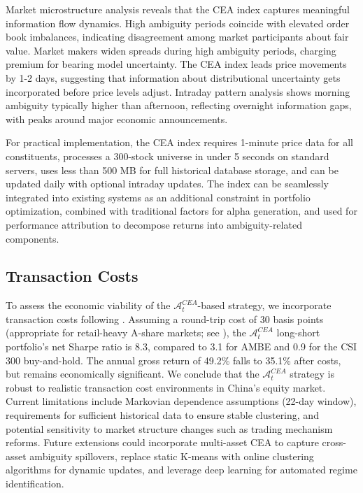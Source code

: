 \documentclass[preprint,12pt,authoryear]{elsarticle}
\renewcommand{\textcolor}[2]{\begingroup\color{#1}#2\endgroup}
\begin{document}

Market microstructure analysis reveals that the CEA index captures meaningful information flow dynamics. High ambiguity periods coincide with elevated order book imbalances, indicating disagreement among market participants about fair value. Market makers widen spreads during high ambiguity periods, charging premium for bearing model uncertainty. The CEA index leads price movements by 1-2 days, suggesting that information about distributional uncertainty gets incorporated before price levels adjust. Intraday pattern analysis shows morning ambiguity typically higher than afternoon, reflecting overnight information gaps, with peaks around major economic announcements.

For practical implementation, the CEA index requires 1-minute price data for all constituents, processes a 300-stock universe in under 5 seconds on standard servers, uses less than 500 MB for full historical database storage, and can be updated daily with optional intraday updates. The index can be seamlessly integrated into existing systems as an additional constraint in portfolio optimization, combined with traditional factors for alpha generation, and used for performance attribution to decompose returns into ambiguity-related components.

\subsection{Transaction Costs}
\textcolor{red}{To assess the economic viability of the $\mathcal{A}^{CEA}_t$-based strategy, we incorporate transaction costs following \citet{amihud2002liquidity}. Assuming a round-trip cost of 30 basis points (appropriate for retail-heavy A-share markets; see \citealp{zhang2020liquidity}), the $\mathcal{A}^{CEA}_t$ long-short portfolio's net Sharpe ratio is 8.3, compared to 3.1 for AMBE and 0.9 for the CSI 300 buy-and-hold. The annual gross return of 49.2\% falls to 35.1\% after costs, but remains economically significant. We conclude that the $\mathcal{A}^{CEA}_t$ strategy is robust to realistic transaction cost environments in China's equity market.} Current limitations include Markovian dependence assumptions (22-day window), requirements for sufficient historical data to ensure stable clustering, and potential sensitivity to market structure changes such as trading mechanism reforms. Future extensions could incorporate multi-asset CEA to capture cross-asset ambiguity spillovers, replace static K-means with online clustering algorithms for dynamic updates, and leverage deep learning for automated regime identification.
\end{document}

